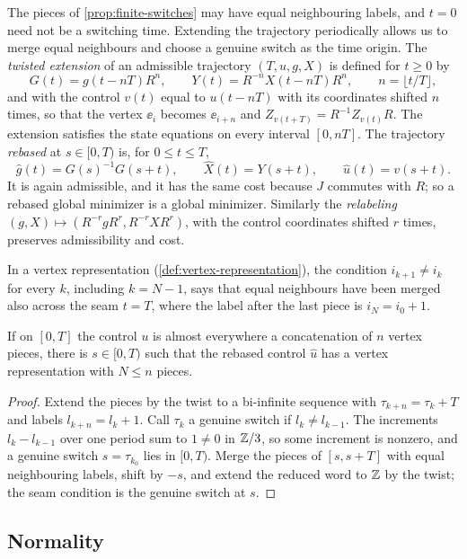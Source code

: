 The pieces of \cref{prop:finite-switches} may have equal neighbouring labels, and $t=0$ need
not be a switching time. Extending the trajectory periodically allows us to merge equal
neighbours and choose a genuine switch as the time origin. The \emph{twisted
extension} of an admissible trajectory $(T,u,g,X)$ is defined for $t\ge0$ by
\[
G(t)=g(t-nT)R^n,\qquad Y(t)=R^{-n}X(t-nT)R^n,\qquad n=\lfloor t/T\rfloor,
\]
and with the control $v(t)$ equal to $u(t-nT)$ with its coordinates shifted $n$ times, so that
the vertex $\ee_i$ becomes $\ee_{i+n}$ and $Z_{v(t+T)}=R^{-1}Z_{v(t)}R$. The extension satisfies the state equations
on every interval $[0,nT]$. The trajectory \emph{rebased} at $s\in[0,T)$ is, for $0\le t\le T$,
\[
\hat g(t)=G(s)^{-1}G(s+t),\qquad \hat X(t)=Y(s+t),\qquad \hat u(t)=v(s+t).
\]
It is again admissible, and it has the same cost because $J$ commutes with $R$; so a rebased global
minimizer is a global minimizer. Similarly the
\emph{relabeling} $(g,X)\mapsto(R^{-r}gR^r,R^{-r}XR^r)$, with the control coordinates shifted $r$
times, preserves admissibility and cost.



In a vertex representation (\cref{def:vertex-representation}), the condition $i_{k+1}\ne i_k$ for every $k$, including $k=N-1$, says that equal neighbours have
been merged also across the seam $t=T$, where the label after the last piece is $i_N=i_0+1$.

\begin{lemma}\label{lem:word-reduction}
If on $[0,T]$ the control $u$ is almost everywhere a concatenation of $n$ vertex pieces, there is
$s\in[0,T)$ such that the rebased control $\hat u$ has a vertex representation with $N\le n$ pieces.
\end{lemma}

\begin{proof}
Extend the pieces by the twist to a bi-infinite sequence with $\tau_{k+n}=\tau_k+T$ and labels
$l_{k+n}=l_k+1$. Call $\tau_k$ a genuine switch if $l_k\ne l_{k-1}$. The increments
$l_k-l_{k-1}$ over one period sum to $1\ne0$ in $\mathbb{Z}/3$, so some increment is nonzero, and a genuine
switch $s=\tau_{k_0}$ lies in $[0,T)$. Merge the pieces of $[s,s+T]$ with equal neighbouring
labels, shift by $-s$, and extend the reduced word to $\mathbb{Z}$ by the twist; the seam condition is the
genuine switch at $s$.
\end{proof}

\subsection{Normality}\label{red:normal-sec}

